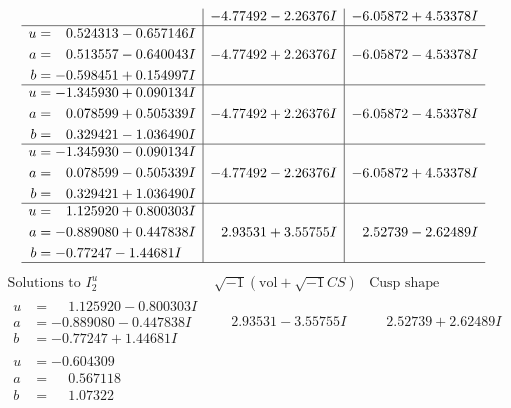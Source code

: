 \documentclass[1p]{elsarticle_modified}
\theoremstyle{definition}
\newcommand{\I}{\sqrt{-1}}
\begin{document}
$$\begin{array}{c|c|c}
 & -4.77492 - 2.26376 I & -6.05872 + 4.53378 I \\ \hline\begin{aligned}
u &= \phantom{-}0.524313 - 0.657146 I \\
a &= \phantom{-}0.513557 - 0.640043 I \\
b &= -0.598451 + 0.154997 I\end{aligned}
 & -4.77492 + 2.26376 I & -6.05872 - 4.53378 I \\ \hline\begin{aligned}
u &= -1.345930 + 0.090134 I \\
a &= \phantom{-}0.078599 + 0.505339 I \\
b &= \phantom{-}0.329421 - 1.036490 I\end{aligned}
 & -4.77492 + 2.26376 I & -6.05872 - 4.53378 I \\ \hline\begin{aligned}
u &= -1.345930 - 0.090134 I \\
a &= \phantom{-}0.078599 - 0.505339 I \\
b &= \phantom{-}0.329421 + 1.036490 I\end{aligned}
 & -4.77492 - 2.26376 I & -6.05872 + 4.53378 I \\ \hline\begin{aligned}
u &= \phantom{-}1.125920 + 0.800303 I \\
a &= -0.889080 + 0.447838 I \\
b &= -0.77247 - 1.44681 I\end{aligned}
 & \phantom{-}2.93531 + 3.55755 I & \phantom{-}2.52739 - 2.62489 I\\
 \hline 
 \end{array}$$\newpage$$\begin{array}{c|c|c}  
\text{Solutions to }I^u_{2}& \I (\text{vol} + \sqrt{-1}CS) & \text{Cusp shape}\\
 \hline 
\begin{aligned}
u &= \phantom{-}1.125920 - 0.800303 I \\
a &= -0.889080 - 0.447838 I \\
b &= -0.77247 + 1.44681 I\end{aligned}
 & \phantom{-}2.93531 - 3.55755 I & \phantom{-}2.52739 + 2.62489 I \\ \hline\begin{aligned}
u &= -0.604309\phantom{ +0.000000I} \\
a &= \phantom{-}0.567118\phantom{ +0.000000I} \\
b &= \phantom{-}1.07322\phantom{ +0.000000I}\end{aligned}

\end{array}$$
\end{document}

